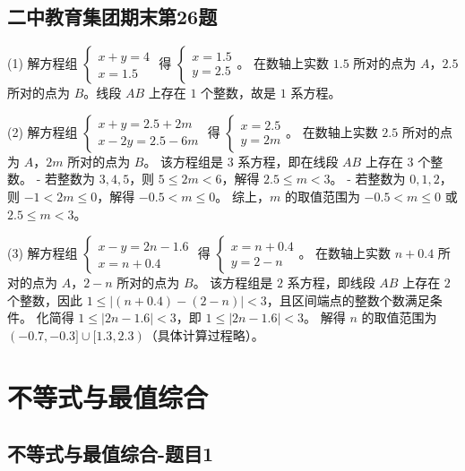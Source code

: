 \subsection{二中教育集团期末第26题}

\label{二中教育集团期末第26题}  %

(1) 解方程组 $\begin{cases} x + y = 4 \\ x = 1.5 \end{cases}$ 得 $\begin{cases} x = 1.5 \\ y = 2.5 \end{cases}$。  
在数轴上实数 $1.5$ 所对的点为 $A$，$2.5$ 所对的点为 $B$。线段 $AB$ 上存在 $1$ 个整数，故是 $1$ 系方程。

(2) 解方程组 $\begin{cases} x + y = 2.5 + 2m \\ x - 2y = 2.5 - 6m \end{cases}$ 得 $\begin{cases} x = 2.5 \\ y = 2m \end{cases}$。  
在数轴上实数 $2.5$ 所对的点为 $A$，$2m$ 所对的点为 $B$。  
该方程组是 $3$ 系方程，即在线段 $AB$ 上存在 $3$ 个整数。  
- 若整数为 $3,4,5$，则 $5 \le 2m < 6$，解得 $2.5 \le m < 3$。  
- 若整数为 $0,1,2$，则 $-1 < 2m \le 0$，解得 $-0.5 < m \le 0$。  
综上，$m$ 的取值范围为 $-0.5 < m \le 0$ 或 $2.5 \le m < 3$。

(3) 解方程组 $\begin{cases} x - y = 2n - 1.6 \\ x = n + 0.4 \end{cases}$ 得 $\begin{cases} x = n + 0.4 \\ y = 2 - n \end{cases}$。  
在数轴上实数 $n+0.4$ 所对的点为 $A$，$2-n$ 所对的点为 $B$。  
该方程组是 $2$ 系方程，即线段 $AB$ 上存在 $2$ 个整数，因此 $1 \le | (n+0.4) - (2-n) | < 3$，且区间端点的整数个数满足条件。  
化简得 $1 \le |2n - 1.6| < 3$，即 $1 \le |2n-1.6| < 3$。  
解得 $n$ 的取值范围为 $(-0.7, -0.3] \cup [1.3, 2.3)$（具体计算过程略）。


\section{不等式与最值综合}
\subsection{不等式与最值综合-题目1}
\label{不等式与最值综合-题目1}

